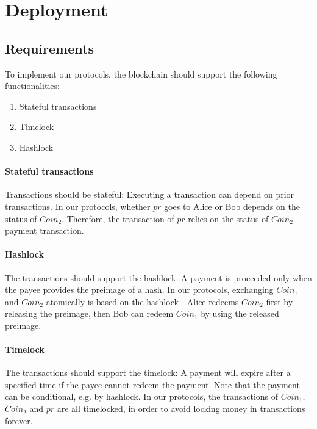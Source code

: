 \section{Deployment}
\label{sec:deployment}


\subsection{Requirements}

To implement our protocols, the blockchain should support the following functionalities:

\begin{enumerate}
    \item Stateful transactions
    \item Timelock
    \item Hashlock
\end{enumerate}

\paragraph{Stateful transactions}
Transactions should be stateful: Executing a transaction can depend on prior transactions.
In our protocols, whether $pr$ goes to Alice or Bob depends on the status of $Coin_2$.
Therefore, the transaction of $pr$ relies on the status of $Coin_2$ payment transaction.

\paragraph{Hashlock}
The transactions should support the hashlock: A payment is proceeded only when the payee provides the preimage of a hash.
In our protocols, exchanging $Coin_1$ and $Coin_2$ atomically is based on the hashlock -
Alice redeems $Coin_2$ first by releasing the preimage, then Bob can redeem $Coin_1$ by using the released preimage.

\paragraph{Timelock}
The transactions should support the timelock: A payment will expire after a specified time if the payee cannot redeem the payment.
Note that the payment can be conditional, e.g. by hashlock.
In our protocols, the transactions of $Coin_1$, $Coin_2$ and $pr$ are all timelocked, in order to avoid locking money in transactions forever.

